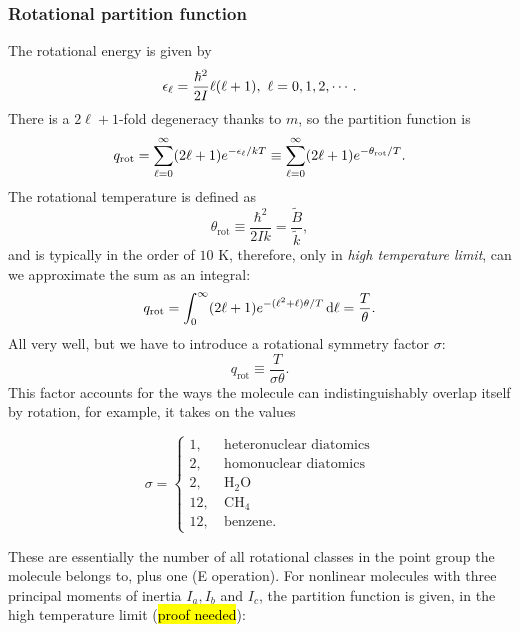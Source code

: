 \subsubsection{Rotational partition function}
The rotational energy is given by 
\begin{equation}
\ep_{\ell}=\frac{\hbar^2}{2I}\ell(\ell+1),\ \ell=0,1,2,\cdots.
\end{equation}
There is a $2\ell+1$-fold degeneracy thanks to $m$, so the partition function is 
\begin{equation}
q_{\text{rot}}=\sum^{\infty}_{\ell=0} (2\ell+1)e^{-\epsilon_{\ell}/kT}\equiv \sum^{\infty}_{\ell=0} (2\ell+1)e^{-\theta_{\text{rot}}/T}.
\end{equation}
The rotational temperature is defined as 
\begin{equation}
\theta_{\text{rot}}\equiv\frac{\hbar^2}{2Ik}=\frac{\widetilde{B}}{\widetilde{k}}, 
\end{equation}
and is typically in the order of $10$ K, therefore, only in \textit{high 
temperature limit}, can we approximate the sum as an integral:
\begin{equation}
q_{\text{rot}}=\intinfp(2\ell+1)e^{-(\ell^2+\ell)\theta/T}\dif\ell=\frac{T}{\theta}.
\end{equation}
All very well, but we have to introduce a rotational symmetry factor $\sigma$: 
\begin{equation}
q_{\text{rot}}\equiv\frac{T}{\sigma\theta}.
\end{equation}
This factor accounts for the ways the molecule can indistinguishably overlap itself by rotation, for example, it takes on the values
\begin{singlespace}
\begin{equation}
\sigma=
\begin{cases}
1,\ &\text{heteronuclear diatomics}\\
2,\ &\text{homonuclear diatomics}\\
2,\ &\text{H$_2$O}\\
12,\ &\text{CH$_4$}\\
12,\ &\text{benzene}.
\end{cases}
\end{equation}
\end{singlespace}
These are essentially the number of all rotational classes in the point group the molecule belongs to, plus one (E operation).
For nonlinear molecules with three principal moments of inertia 
$I_a,I_b$ and $I_c$, the partition function is given, in the high temperature 
limit (\hl{proof needed}):
